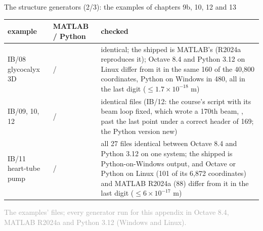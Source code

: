 \documentclass[aspectratio=169,11pt]{beamer}
\newcommand{\sourcecredit}[1]{\vfill\begin{flushright}\tiny\textcolor{DarkGray}{#1}\end{flushright}}
\begin{document}
\begin{frame}{The structure generators (2/3): the examples of chapters 9b, 10, 12 and 13}
\label{fr:gen2}
\scriptsize
\renewcommand{\arraystretch}{1.0}
\begin{tabular}{@{}L{0.2\textwidth}L{0.3\textwidth}L{0.43\textwidth}@{}}
\toprule
example & MATLAB / Python & checked \\
\midrule
IB/08 glycocalyx 3D &  /  &  identical; the shipped  is MATLAB's (R2024a reproduces it); Octave 8.4 and Python 3.12 on Linux differ from it in the same 160 of the 40,800 coordinates, Python on Windows in 480, all in the last digit ($\le 1.7\times10^{-18}$ m) \\
IB/09, 10, 12 &  /  & identical files (IB/12: the course's script with its beam loop fixed, which wrote a 170th beam, , past the last point under a correct header of 169; the Python version new) \\
IB/11 heart-tube pump &  /  & all 27 files identical between Octave 8.4 and Python 3.12 on one system; the shipped  is Python-on-Windows output, and Octave or Python on Linux (101 of its 6,872 coordinates) and MATLAB R2024a (88) differ from it in the last digit ($\le 6\times10^{-17}$ m) \\
\bottomrule
\end{tabular}
\sourcecredit{The examples'  files; every generator run for this appendix in Octave 8.4, MATLAB R2024a and Python 3.12 (Windows and Linux).}
\end{frame}
\end{document}
